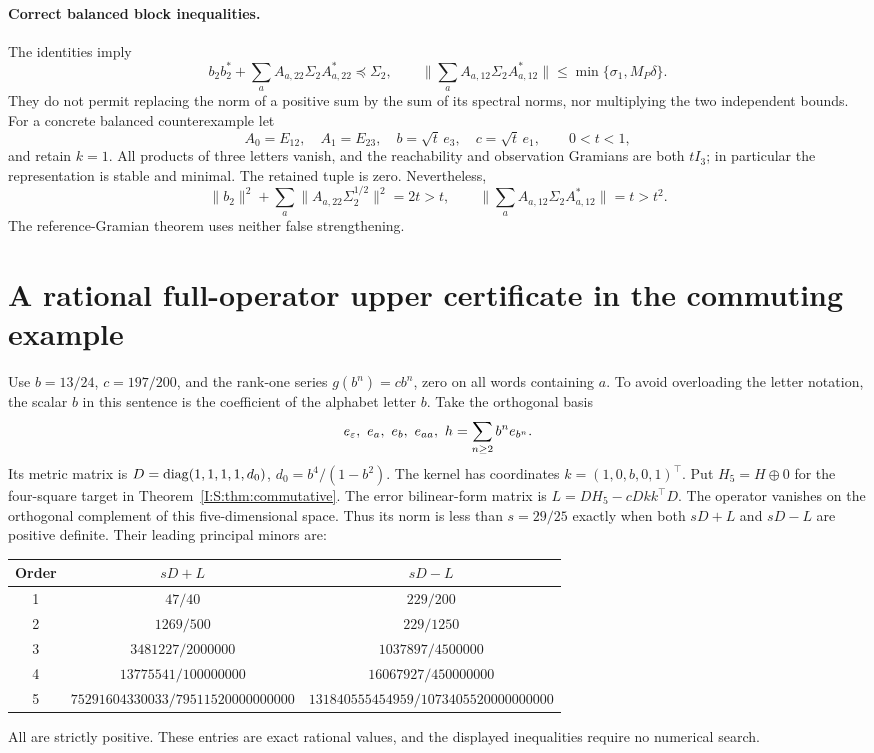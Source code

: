 \paragraph{Correct balanced block inequalities.}
The identities imply
\[
 b_2b_2^*+\sum_aA_{a,22}\Sigma_2A_{a,22}^*\preceq\Sigma_2,
 \qquad
 \Big\|\sum_aA_{a,12}\Sigma_2A_{a,12}^*\Big\|
                  \le\min\{\sigma_1,M_P\delta\}.
\]
They do not permit replacing the norm of a positive sum by the sum
of its spectral norms, nor multiplying the two independent bounds.
For a concrete balanced counterexample let
\[
 A_0=E_{12},\quad A_1=E_{23},\quad
 b=\sqrt t\,e_3,\quad c=\sqrt t\,e_1,\qquad 0<t<1,
\]
and retain $k=1$. All products of three letters vanish, and the
reachability and observation Gramians are both $tI_3$; in particular
the representation is stable and minimal. The retained tuple is zero.
Nevertheless,
\[
 \|b_2\|^2+\sum_a\|A_{a,22}\Sigma_2^{1/2}\|^2=2t>t,
 \qquad
 \Big\|\sum_aA_{a,12}\Sigma_2A_{a,12}^*\Big\|=t>t^2.
\]
The reference-Gramian theorem uses neither false strengthening.

\section{A rational full-operator upper certificate in the commuting example}\label{I:S:app:commupper}
Use $b=13/24$, $c=197/200$, and the rank-one series $g(b^n)=cb^n$, zero on all words containing $a$. To avoid overloading the letter notation, the scalar $b$ in this sentence is the coefficient of the alphabet letter $b$. Take the orthogonal basis
\[
 e_\Seps,\ e_a,\ e_b,\ e_{aa},\
 h=\sum_{n\ge2}b^ne_{b^n}.
\]
Its metric matrix is $D=\operatorname{diag}(1,1,1,1,d_0)$, $d_0=b^4/(1-b^2)$. The kernel has coordinates $k=(1,0,b,0,1)^\top$. Put $H_5=H\oplus0$ for the four-square target in Theorem~\ref{I:S:thm:commutative}. The error bilinear-form matrix is
$L=DH_5-cDkk^\top D$. The operator vanishes on the orthogonal complement of this five-dimensional space. Thus its norm is less than $s=29/25$ exactly when both $sD+L$ and $sD-L$ are positive definite. Their leading principal minors are:
\begin{center}\small
\begin{tabular}{@{}ccc@{}}
\toprule
Order & $sD+L$ & $sD-L$\\\midrule
1 & $47/40$ & $229/200$\\
2 & $1269/500$ & $229/1250$\\
3 & $3481227/2000000$ & $1037897/4500000$\\
4 & $13775541/100000000$ & $16067927/450000000$\\
5 & $75291604330033/79511520000000000$ & $131840555454959/1073405520000000000$\\
\bottomrule
\end{tabular}
\end{center}
All are strictly positive. These entries are exact rational values, and the displayed inequalities require no numerical search.
